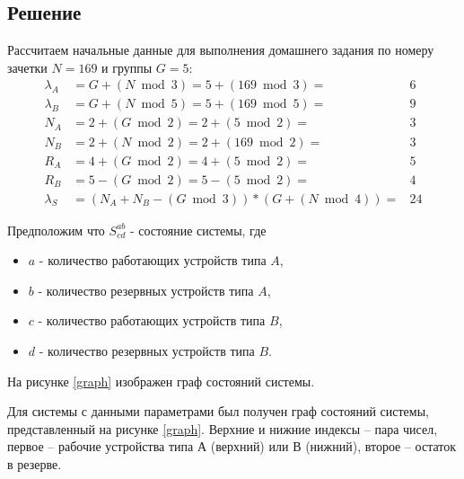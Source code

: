 \subsection{Решение}

Рассчитаем начальные данные для выполнения домашнего задания по номеру зачетки $N = 169$ и группы $G = 5$:
\[
\begin{matrix}
    \lambda_A & = G + (N \bmod 3) = 5 + (169 \bmod 3) = & 6 \\
    \lambda_B & = G + (N \bmod 5) = 5 + (169 \bmod 5) = & 9 \\
    N_A & = 2 + (G \bmod 2) = 2 + (5 \bmod 2) = & 3 \\
    N_B & = 2 + (N \bmod 2) = 2 + (169 \bmod 2) = & 3 \\
    R_A & = 4 + (G \bmod 2) = 4 + (5 \bmod 2) = & 5 \\
    R_B & = 5 - (G \bmod 2) = 5 - (5 \bmod 2) = & 4 \\
    \lambda_S & = (N_A + N_B - (G \bmod 3)) * (G + (N \bmod 4)) = & 24
\end{matrix}
\]

Предположим что $S^{ab}_{cd}$ - состояние системы, где
\begin{itemize}
    \item $a$ - количество работающих устройств типа $A$,
    \item $b$ - количество резервных устройств типа $A$,
    \item $c$ - количество работающих устройств типа $B$,
    \item $d$ - количество резервных устройств типа $B$.
\end{itemize}
На рисунке \ref{graph} изображен граф состояний системы.

Для системы с данными параметрами был получен граф состояний системы, представленный на рисунке \ref{graph}. Верхние и нижние индексы -- пара чисел, первое -- рабочие устройства типа $А$ (верхний) или $В$ (нижний), второе -- остаток в резерве.

